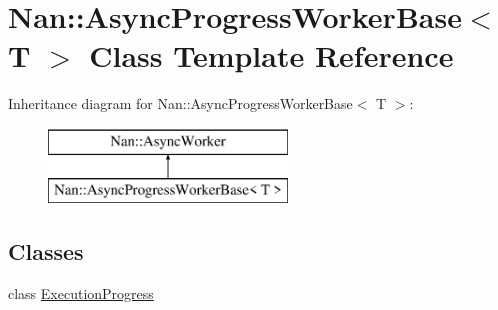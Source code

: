 \hypertarget{class_nan_1_1_async_progress_worker_base}{}\section{Nan\+:\+:Async\+Progress\+Worker\+Base$<$ T $>$ Class Template Reference}
\label{class_nan_1_1_async_progress_worker_base}
Inheritance diagram for Nan\+:\+:Async\+Progress\+Worker\+Base$<$ T $>$\+:\begin{figure}[H]
\begin{center}
\leavevmode
\includegraphics[height=2.000000cm]{class_nan_1_1_async_progress_worker_base}
\end{center}
\end{figure}
\subsection*{Classes}
\begin{DoxyCompactItemize}
\item 
class \hyperlink{class_nan_1_1_async_progress_worker_base_1_1_execution_progress}{Execution\+Progress}
\end{DoxyCompactItemize}
